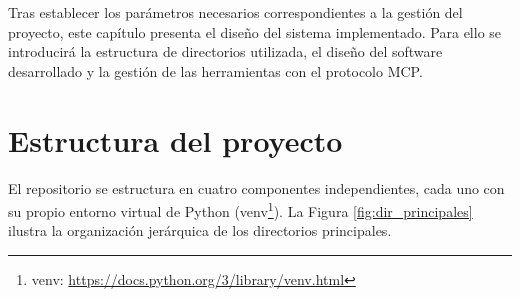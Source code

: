 Tras establecer los parámetros necesarios correspondientes a la gestión del proyecto, este capítulo presenta el diseño del sistema implementado. Para ello se introducirá la estructura de directorios utilizada, el diseño del software desarrollado y la gestión de las herramientas con el protocolo MCP. 

\section{Estructura del proyecto}
El repositorio se estructura en cuatro componentes independientes, cada uno con su propio entorno virtual de Python (venv\footnote{venv: \url{https://docs.python.org/3/library/venv.html}}). La Figura \ref{fig:dir_principales} ilustra la organización jerárquica de los directorios principales.

